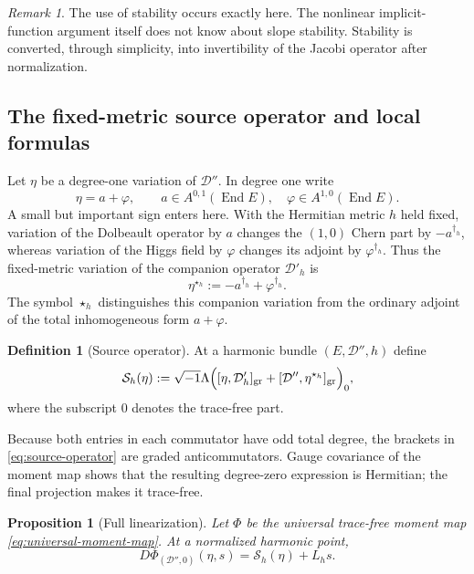 \documentclass[11pt,reqno]{amsart}
\newtheorem{proposition}[theorem]{Proposition}
\theoremstyle{definition}
\newtheorem{definition}[theorem]{Definition}
\theoremstyle{remark}
\newtheorem{remark}[theorem]{Remark}
\newcommand{\cD}{\mathcal D}
\newcommand{\cS}{\mathcal S}
\newcommand{\End}{\operatorname{End}}
\begin{document}
\begin{remark}
The use of stability occurs exactly here.  The nonlinear implicit-function argument itself does not know about slope stability.  Stability is converted, through simplicity, into invertibility of the Jacobi operator after normalization.
\end{remark}

\subsection{The fixed-metric source operator and local formulas}

Let $\eta$ be a degree-one variation of $\cD''$.  In degree one write
\[
  \eta=a+\varphi,
  \qquad
  a\in A^{0,1}(\End E),
  \quad
  \varphi\in A^{1,0}(\End E).
\]
A small but important sign enters here.  With the Hermitian metric $h$ held fixed, variation of the Dolbeault operator by $a$ changes the $(1,0)$ Chern part by $-a^{\dagger_h}$, whereas variation of the Higgs field by $\varphi$ changes its adjoint by $\varphi^{\dagger_h}$.  Thus the fixed-metric variation of the companion operator $\cD'_h$ is
\begin{equation}\label{eq:star-companion}
  \eta^{\star_h}
  :=-a^{\dagger_h}+\varphi^{\dagger_h}.
\end{equation}
The symbol $\star_h$ distinguishes this companion variation from the ordinary adjoint of the total inhomogeneous form $a+\varphi$.

\begin{definition}[Source operator]\label{def:source-operator}
At a harmonic bundle $(E,\cD'',h)$ define
\begin{equation}\label{eq:source-operator}
  \cS_h(\eta)
  :=\sqrt{-1}\Lambda\Bigl(
  [\eta,\cD'_h]_{\mathrm{gr}}
  +[\cD'',\eta^{\star_h}]_{\mathrm{gr}}
  \Bigr)_0,
\end{equation}
where the subscript $0$ denotes the trace-free part.
\end{definition}

Because both entries in each commutator have odd total degree, the brackets in \eqref{eq:source-operator} are graded anticommutators.  Gauge covariance of the moment map shows that the resulting degree-zero expression is Hermitian; the final projection makes it trace-free.

\begin{proposition}[Full linearization]\label{prop:full-linearization}
Let $\Phi$ be the universal trace-free moment map \eqref{eq:universal-moment-map}.  At a normalized harmonic point,
\begin{equation}\label{eq:full-linearization}
  D\Phi_{(\cD'',0)}(\eta,s)
  =\cS_h(\eta)+L_hs.
\end{equation}
\end{proposition}
\end{document}
